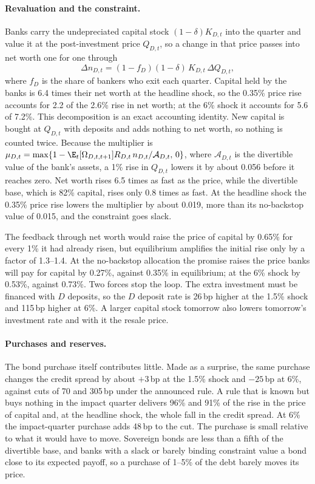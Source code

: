 \paragraph{Revaluation and the constraint.}
Banks carry the undepreciated capital stock $(1-\delta)K_{D,t}$ into the quarter and value it
at the post-investment price $Q_{D,t}$, so a change in that price passes into net worth one
for one through
\begin{equation}
\Delta n_{D,t}=(1-f_D)(1-\delta)\,K_{D,t}\,\Delta Q_{D,t},
\label{eq:revaluation}
\end{equation}
where $f_D$ is the share of bankers who exit each quarter. Capital held by the banks is 6.4
times their net worth at the headline shock, so the 0.35\% price rise accounts for 2.2 of the
2.6\% rise in net worth; at the 6\% shock it accounts for 5.6 of 7.2\%. This decomposition is
an exact accounting identity. New capital is bought at $Q_{D,t}$ with deposits and adds
nothing to net worth, so nothing is counted twice. Because the multiplier is
$\mu_{D,t}=\max\{1-\E_t[\Omega_{D,t,t+1}]R_{D,t}\,n_{D,t}/\mathcal A_{D,t},\,0\}$, where
$\mathcal A_{D,t}$ is the divertible value of the bank's assets, a 1\% rise in $Q_{D,t}$
lowers it by about 0.056 before it reaches zero. Net worth rises 6.5 times as fast as
the price, while the divertible base, which is 82\% capital, rises only 0.8 times as fast. At
the headline shock the 0.35\% price rise lowers the multiplier by about 0.019, more than its
no-backstop value of 0.015, and the constraint goes slack.

The feedback through net worth would raise the price of capital by 0.65\% for every 1\% it
had already risen, but equilibrium amplifies the initial rise only by a factor of 1.3--1.4.
At the no-backstop allocation the promise raises the price banks will pay for capital by
0.27\%, against 0.35\% in equilibrium; at the 6\% shock by 0.53\%, against 0.73\%. Two
forces stop the loop. The extra investment must be financed with $D$ deposits, so the $D$
deposit rate is 26\,bp higher at the 1.5\% shock and 115\,bp higher at 6\%. A larger capital
stock tomorrow also lowers tomorrow's investment rate and with it the resale price.

\paragraph{Purchases and reserves.}
The bond purchase itself contributes little. Made as a surprise, the same purchase changes the
credit spread by about $+3$\,bp at the 1.5\% shock and $-25$\,bp at 6\%, against cuts of 70 and
305\,bp under the announced rule. A rule that is known but buys nothing in the impact quarter
delivers 96\% and 91\% of the rise in the price of capital and, at the headline shock, the
whole fall in the credit spread. At 6\% the impact-quarter purchase adds 48\,bp to the cut.
The purchase is small relative to what it would have to move. Sovereign bonds are less than a
fifth of the divertible base, and banks with a slack or barely binding constraint value a bond
close to its expected payoff, so a purchase of 1--5\% of the debt barely moves its price.


